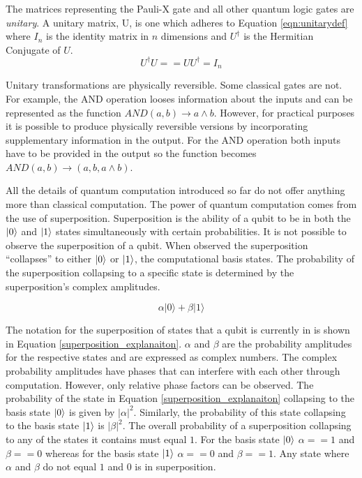 The matrices representing the Pauli-X gate and all other quantum logic gates are \emph{unitary}.
A unitary matrix, U, is one which adheres to Equation \ref{eqn:unitarydef} where $I_n$ is the identity matrix in $n$ dimensions and $U^{\dagger}$ is the Hermitian Conjugate of $U$.
\begin{equation}
\label{eqn:unitarydef}
U^{\dagger}
U == UU^{\dagger} = I_n
\end{equation}

Unitary transformations are physically reversible.
Some classical gates are not.
For example, the AND operation looses information about the inputs and can be represented as the function $AND(a,b)\rightarrow{a\wedge{b}}$.
However, for practical purposes it is possible to produce physically reversible versions by incorporating supplementary information in the output.
For the AND operation both inputs have to be provided in the output so the function becomes $AND(a,b)\rightarrow{(a,b,a\wedge{b})}$.

All the details of quantum computation introduced so far do not offer anything more than classical computation.
The power of quantum computation comes from the use of superposition.
Superposition is the ability of a qubit to be in both the $\left\vert{0}\right\rangle$ and $\left\vert{1}\right\rangle$ states simultaneously with certain probabilities.
It is not possible to observe the superposition of a qubit.
When observed the superposition ``collapses'' to either $\left\vert{0}\right\rangle$ or $\left\vert{1}\right\rangle$, the computational basis states.
The probability of the superposition collapsing to a specific state is determined by the superposition's complex amplitudes.

\begin{equation}
\label{superposition_explanaiton}
\alpha\vert0\rangle+\beta\vert1\rangle
\end{equation}

The notation for the superposition of states that a qubit is currently in is shown in Equation \ref{superposition_explanaiton}.
$\alpha$ and $\beta$ are the probability amplitudes for the respective states and are expressed as complex numbers.
The complex probability amplitudes have phases that can interfere with each other through computation.
However, only relative phase factors can be observed.
The probability of the state in Equation \ref{superposition_explanaiton} collapsing to the basis state $\left\vert{0}\right\rangle$ is given by $\vert\alpha\vert^2$.
Similarly, the probability of this state collapsing to the basis state $\left\vert{1}\right\rangle$ is $\vert\beta\vert^2$.
The overall probability of a superposition collapsing to any of the states it contains must equal $1$.
For the basis state $\left\vert{0}\right\rangle$ $\alpha==1$ and $\beta==0$ whereas for the basis state $\left\vert{1}\right\rangle$ $\alpha==0$ and $\beta==1$.
Any state where $\alpha$ and $\beta$ do not equal $1$ and $0$ is in superposition.

